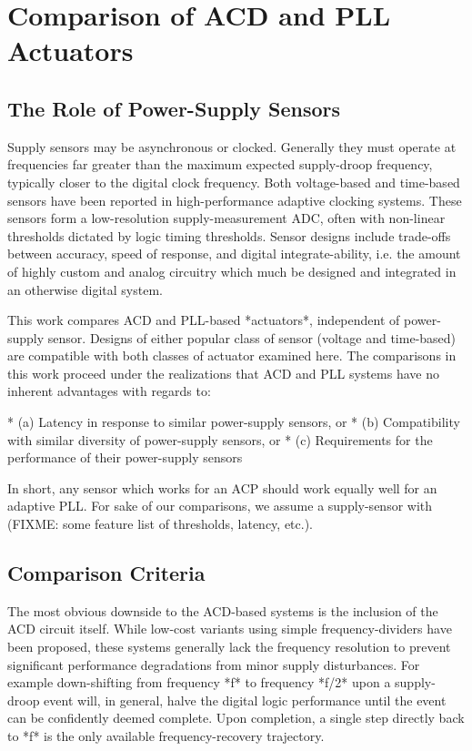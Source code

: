 \documentclass[twoside,9pt,journal,letterpage]{IEEEtran}
\begin{document}
\section{Comparison of ACD and PLL Actuators}
\label{sec:comparison}

\subsection{The Role of Power-Supply Sensors}

Supply sensors may be asynchronous or clocked. Generally they must operate at frequencies far greater than the maximum expected supply-droop frequency, typically closer to the digital clock frequency. Both voltage-based and time-based sensors have been reported in high-performance adaptive clocking systems. These sensors form a low-resolution supply-measurement ADC, often with non-linear thresholds dictated by logic timing thresholds. Sensor designs include trade-offs between accuracy, speed of response, and digital integrate-ability, i.e. the amount of highly custom and analog circuitry which much be designed and integrated in an otherwise digital system. 

This work compares ACD and PLL-based *actuators*, independent of power-supply sensor. Designs of either popular class of sensor (voltage and time-based) are compatible with both classes of actuator examined here. The comparisons in this work proceed under the realizations that ACD and PLL systems have no inherent advantages with regards to:

* (a) Latency in response to similar power-supply sensors, or
* (b) Compatibility with similar diversity of power-supply sensors, or
* (c) Requirements for the performance of their power-supply sensors

In short, any sensor which works for an ACP should work equally well for an adaptive PLL. For sake of our comparisons, we assume a supply-sensor with (FIXME: some feature list of thresholds, latency, etc.). 

\subsection{Comparison Criteria}

The most obvious downside to the ACD-based systems is the inclusion of the ACD circuit itself. While low-cost variants using simple frequency-dividers have been proposed, these systems generally lack the frequency resolution to prevent significant performance degradations from minor supply disturbances. For example down-shifting from frequency *f* to frequency *f/2* upon a supply-droop event will, in general, halve the digital logic performance until the event can be confidently deemed complete. Upon completion, a single step directly back to *f* is the only available frequency-recovery trajectory. 
\end{document}
